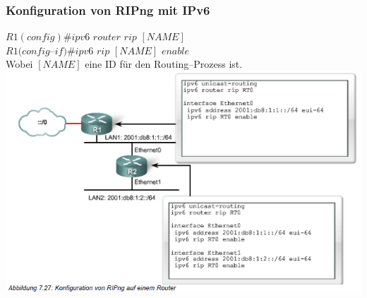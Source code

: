 \documentclass[landscape,twocolumn,a4paper]{article}
\begin{document}
\begin{footnotesize}
\subsubsection{Konfiguration von RIPng mit IPv6}
$R1(config)\#ipv6$ $router$ $rip$ $[NAME]$\\
$R1(config$--$if)\#ipv6$ $rip$ $[NAME]$ $enable$\\
Wobei $[NAME]$ eine ID für den Routing--Prozess ist.\\
\includegraphics[scale=0.5]{ipv6-ripng.png}
\end{footnotesize}
\end{document}
